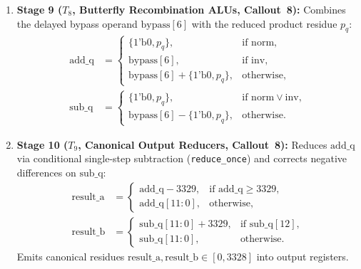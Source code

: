 \begin{enumerate}
    \item \textbf{Stage 9 ($T_8$, Butterfly Recombination ALUs, Callout~8):} Combines the delayed bypass operand $\text{bypass}[6]$ with the reduced product residue $p_q$:
    \begin{equation}
    \label{eq:stage9_recomb}
    \begin{aligned}
    \text{add\_q} &= \begin{cases}
    \{1\text{'b0}, p_q\}, & \text{if norm}, \\
    \text{bypass}[6], & \text{if inv}, \\
    \text{bypass}[6] + \{1\text{'b0}, p_q\}, & \text{otherwise},
    \end{cases} \\
    \text{sub\_q} &= \begin{cases}
    \{1\text{'b0}, p_q\}, & \text{if norm} \lor \text{inv}, \\
    \text{bypass}[6] - \{1\text{'b0}, p_q\}, & \text{otherwise}.
    \end{cases}
    \end{aligned}
    \end{equation}

    \item \textbf{Stage 10 ($T_9$, Canonical Output Reducers, Callout~8):} Reduces $\text{add\_q}$ via conditional single-step subtraction (\texttt{reduce\_once}) and corrects negative differences on $\text{sub\_q}$:
    \begin{align}
    \label{eq:stage10_redux}
    \text{result\_a} &= \begin{cases}
    \text{add\_q} - 3329, & \text{if } \text{add\_q} \ge 3329, \\
    \text{add\_q}[11:0], & \text{otherwise},
    \end{cases} \\
    \text{result\_b} &= \begin{cases}
    \text{sub\_q}[11:0] + 3329, & \text{if } \text{sub\_q}[12], \\
    \text{sub\_q}[11:0], & \text{otherwise}.
    \end{cases}
    \end{align}
    Emits canonical residues $\text{result\_a}, \text{result\_b} \in [0, 3328]$ into output registers.
\end{enumerate}

